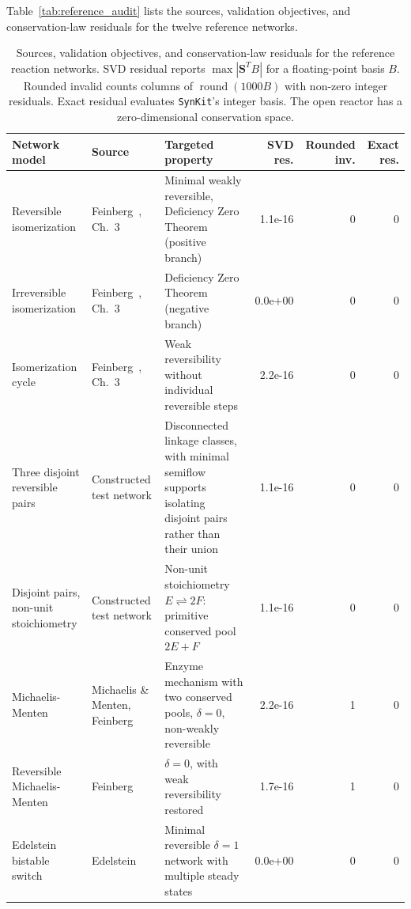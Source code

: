\documentclass[10pt,a4paper,fleqn]{article}
\theoremstyle{plain}\newtheorem{theorem}{Theorem}
\newcommand{\synkit}{\texttt{SynKit}\xspace}
\begin{document}
Table~\ref{tab:reference_audit} lists the sources, validation objectives, and conservation-law residuals for the twelve reference networks.

\begin{table}[htbp]
\centering
\caption{Sources, validation objectives, and conservation-law residuals for the reference reaction networks. SVD residual reports $\max|\mathbf S^TB|$ for a floating-point basis $B$. Rounded invalid counts columns of $\operatorname{round}(1000B)$ with non-zero integer residuals. Exact residual evaluates \synkit's integer basis. The open reactor has a zero-dimensional conservation space.}
\label{tab:reference_audit}
\label{tab:si_validation_sources}
\label{tab:numerical_audit}
\scriptsize
\setlength{\tabcolsep}{3pt}
\begin{tabularx}{\linewidth}{@{}>{\raggedright\arraybackslash}p{3.15cm}>{\raggedright\arraybackslash}p{2.85cm}Xrrr@{}}
\toprule
\textbf{Network model} & \textbf{Source} & \textbf{Targeted property} & \textbf{SVD res.} & \textbf{Rounded inv.} & \textbf{Exact res.} \\
\midrule
Reversible isomerization & Feinberg~\cite{feinberg2019foundations}, Ch.~3 & Minimal weakly reversible, Deficiency Zero Theorem (positive branch) & 1.1e-16 & 0 & 0 \\
Irreversible isomerization & Feinberg~\cite{feinberg2019foundations}, Ch.~3 & Deficiency Zero Theorem (negative branch) & 0.0e+00 & 0 & 0 \\
Isomerization cycle & Feinberg~\cite{feinberg2019foundations}, Ch.~3 & Weak reversibility without individual reversible steps & 2.2e-16 & 0 & 0 \\
Three disjoint reversible pairs & Constructed test network & Disconnected linkage classes, with minimal semiflow supports isolating disjoint pairs rather than their union & 1.1e-16 & 0 & 0 \\
Disjoint pairs, non-unit stoichiometry & Constructed test network & Non-unit stoichiometry $E \rightleftharpoons 2F$: primitive conserved pool $2E+F$ & 1.1e-16 & 0 & 0 \\
Michaelis-Menten & Michaelis \& Menten, Feinberg~\cite{feinberg2019foundations} & Enzyme mechanism with two conserved pools, $\delta=0$, non-weakly reversible & 2.2e-16 & 1 & 0 \\
Reversible Michaelis-Menten & Feinberg~\cite{feinberg2019foundations} & $\delta=0$, with weak reversibility restored & 1.7e-16 & 1 & 0 \\
Edelstein bistable switch & Edelstein~\cite{edelstein1970biochemical} & Minimal reversible $\delta=1$ network with multiple steady states & 0.0e+00 & 0 & 0 \\

\end{tabularx}
\end{table}
\end{document}
